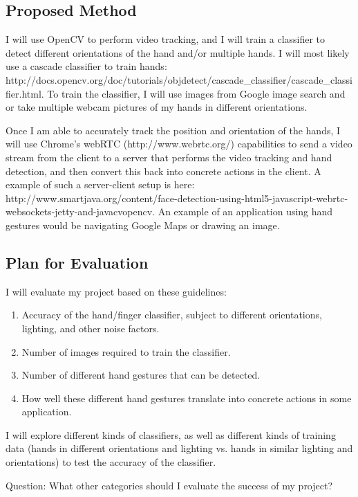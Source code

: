 \documentclass[12pt]{article}
\begin{document}
\subsection{Proposed Method}
I will use OpenCV to perform video tracking, and I will train a classifier to detect different orientations of the hand and/or multiple hands. I will most likely use a cascade classifier to train hands: http://docs.opencv.org/doc/tutorials/objdetect/cascade\_classifier/cascade\_classifier.html. To train the classifier, I will use images from Google image search and or take multiple webcam pictures of my hands in different orientations. 

Once I am able to accurately track the position and orientation of the hands, I will use Chrome's webRTC (http://www.webrtc.org/) capabilities to send a video stream from the client to a server that performs the video tracking and hand detection, and then convert this back into concrete actions in the client. A example of such a server-client setup is here: http://www.smartjava.org/content/face-detection-using-html5-javascript-webrtc-websockets-jetty-and-javacvopencv. An example of an application using hand gestures would be navigating Google Maps or drawing an image.

\subsection{Plan for Evaluation}
I will evaluate my project based on these guidelines:
\begin{enumerate}
\item Accuracy of the hand/finger classifier, subject to different orientations, lighting, and other noise factors.
\item Number of images required to train the classifier.
\item Number of different hand gestures that can be detected.
\item How well these different hand gestures translate into concrete actions in some application.
\end{enumerate}
I will explore different kinds of classifiers, as well as different kinds of training data (hands in different orientations and lighting vs. hands in similar lighting and orientations) to test the accuracy of the classifier.

Question: What other categories should I evaluate the success of my project?
\end{document}
